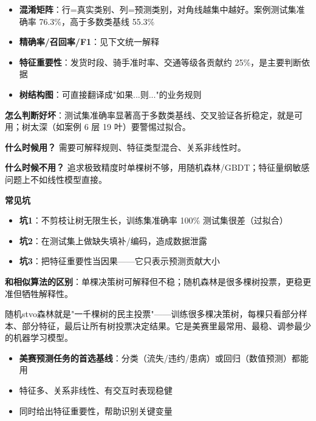 \begin{algoresult}
\begin{itemize}
    \item \textbf{混淆矩阵}：行=真实类别、列=预测类别，对角线越集中越好。案例测试集准确率 76.3\%，高于多数类基线 55.3\%
    \item \textbf{精确率/召回率/F1}：见下文统一解释
    \item \textbf{特征重要性}：发货时段、骑手准时率、交通等级各贡献约 25\%，是主要判断依据
    \item \textbf{树结构图}：可直接翻译成"如果...则..."的业务规则
\end{itemize}

\textbf{怎么判断好坏}：测试集准确率显著高于多数类基线、交叉验证各折稳定，就是可用；树太深（如案例 6 层 19 叶）要警惕过拟合。
\end{algoresult}

\begin{algonotes}
\textbf{什么时候用？} 需要可解释规则、特征类型混合、关系非线性时。

\textbf{什么时候不用？} 追求极致精度时单棵树不够，用随机森林/GBDT；特征量纲敏感问题上不如线性模型直接。

\textbf{常见坑}
\begin{itemize}
    \item \textbf{坑1}：不剪枝让树无限生长，训练集准确率 100\% 测试集很差（过拟合）
    \item \textbf{坑2}：在测试集上做缺失填补/编码，造成数据泄露
    \item \textbf{坑3}：把特征重要性当因果——它只表示预测贡献大小
\end{itemize}

\textbf{和相似算法的区别}：单棵决策树可解释但不稳；随机森林是很多棵树投票，更稳更准但牺牲解释性。
\end{algonotes}


\begin{algointro}
随机stvo森林就是"一千棵树的民主投票"——训练很多棵决策树，每棵只看部分样本、部分特征，最后让所有树投票决定结果。它是美赛里最常用、最稳、调参最少的机器学习模型。
\end{algointro}

\begin{algoscene}
\begin{itemize}
    \item \textbf{美赛预测任务的首选基线}：分类（流失/违约/患病）或回归（数值预测）都能用
    \item 特征多、关系非线性、有交互时表现稳健
    \item 同时给出特征重要性，帮助识别关键变量
\end{itemize}
\end{algoscene}

